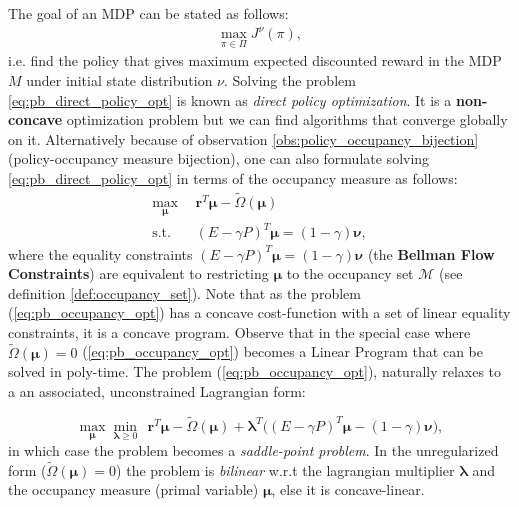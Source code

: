 The goal of an MDP can be stated as follows:
\begin{align}
    \max_{\pi \in \Pi} J^\nu(\pi),
    \label{eq:pb_direct_policy_opt}
\end{align}
i.e. find the policy that gives maximum expected discounted reward in the MDP $\textit{M}$ under initial state distribution $\nu$. Solving the problem \ref{eq:pb_direct_policy_opt} is known as \textit{direct policy optimization}. It is a \textbf{non-concave} optimization problem but we can find algorithms that converge globally on it. Alternatively because of observation \ref{obs:policy_occupancy_bijection} (policy-occupancy measure bijection), one can also formulate solving \ref{eq:pb_direct_policy_opt} in terms of the occupancy measure as follows:
\begin{equation}
    \begin{aligned}
        \max_{\bm{\mu}} & ~~ \bm{r}^T\bm{\bm{\mu}} - \tilde{\Omega}(\bm{\mu})\\
        \text{s.t.} & ~~  (E-\gamma P)^T  \bm{\mu} = (1-\gamma) \bm{\nu},
    \end{aligned}
    \label{eq:pb_occupancy_opt}
\end{equation}
where the equality constraints $ (E-\gamma P)^T  \bm{\mu} = (1-\gamma) \bm{\nu}$ (the \textbf{Bellman Flow Constraints}) are equivalent to restricting $\bm{\mu}$ to the occupancy set $\mathcal{M}$ (see definition \ref{def:occupancy_set}). Note that as the problem (\ref{eq:pb_occupancy_opt}) has a concave cost-function with a set of linear equality constraints, it is a concave program. Observe that in the special case where $\tilde{\Omega}(\bm{\mu})=0$ (\ref{eq:pb_occupancy_opt}) becomes a Linear Program that can be solved in poly-time. The problem (\ref{eq:pb_occupancy_opt}), naturally relaxes to a an associated, unconstrained Lagrangian form:

\begin{equation}
    \max_{\bm{\mu}} \min_{\bm{\lambda} \geq 0 }~~ \bm{r}^T\bm{\bm{\mu}} - \tilde{\Omega}(\bm{\mu}) + \bm{\lambda}^T \big((E-\gamma P)^T  \bm{\mu} - (1-\gamma) \bm{\nu} \big),
    \label{eq:pb_occupancy_lagrangian_opt}
\end{equation}
in which case the problem becomes a \textit{saddle-point problem}. In the unregularized form ($\tilde{\Omega}(\bm{\mu})=0$) the problem is \textit{bilinear} w.r.t the lagrangian multiplier $\bm{\lambda}$ and the occupancy measure (primal variable) $\bm{\mu}$, else it is concave-linear.